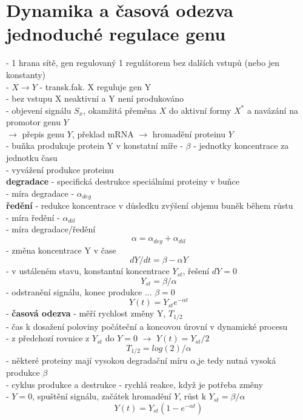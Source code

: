 \documentclass[11pt,a4paper]{report}
\begin{document}
\section{Dynamika a časová odezva jednoduché regulace genu}
- 1 hrana sítě, gen regulovaný 1 regulátorem bez dalších vstupů (nebo jen konstanty)\\
- $X\rightarrow Y$ - transk.fak. X reguluje gen Y\\
- bez vstupu X neaktivní a Y není produkováno\\
- objevení signálu $S_x$, okamžitá přeměna $X$ do aktivní formy $X^*$ a navázání na promotor genu $Y$\\
\indent $\rightarrow$ přepis genu $Y$, překlad mRNA $\rightarrow$ hromadění proteinu $Y$\\
\indent - buňka produkuje protein Y v konstatní míře - $\beta$ - jednotky koncentrace za jednotku času\\
- vyvážení produkce proteinu \\
\indent \textbf{degradace} - specifická destrukce speciálními proteiny v buňce\\
\indent \indent - míra degradace - $\alpha_{deg}$\\
\indent \textbf{ředění} - redukce koncentrace v důsledku zvýšení objemu buněk během růstu\\
\indent \indent - míra ředění - $\alpha_{dil}$\\
\indent - míra degradace/ředění\\
\begin{equation}
\alpha=\alpha_{deg}+\alpha_{dil}
\end{equation}
- změna koncentrace Y v čase
\begin{equation}
dY/dt=\beta-\alpha Y
\end{equation}
- v ustáleném stavu, konstantní koncentrace $Y_{st}$, řešení  $dY=0$\\
\begin{equation}
Y_{st}=\beta/\alpha
\end{equation}
- odstranění signálu, konec produkce ... $\beta=0$\\
\begin{equation}
Y(t)=Y_{st}e^{-\alpha t}
\end{equation}
- \textbf{časová odezva} - měří rychlost změny Y, $T_{1/2}$\\
\indent - čas k dosažení poloviny počáteční a koncovou úrovní v dynamické procesu\\
\indent - z předchozí rovnice z $Y_{st}$ do $Y=0$ $\rightarrow$ $Y(t)=Y_{st}/2$\\
\begin{equation}
T_{1/2}=log(2)/\alpha
\end{equation}
- některé proteiny mají vysokou degradační míru $\alpha$,je tedy nutná vysoká produkce $\beta$\\
\indent - cyklus produkce a destrukce - rychlá reakce, když je potřeba změny\\
- $Y=0$, spuštění signálu, začátek hromadění $Y$, růst k $Y_{st}=\beta/\alpha$\\
\begin{equation}
Y(t)=Y_{st}(1-e^{-\alpha t})
\end{equation}
\end{document}
